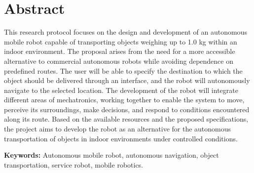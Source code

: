 
\chapter*{Abstract}
\ifProtocolo
\fi

This research protocol focuses on the design and development of an autonomous mobile robot capable of transporting objects weighing up to 1.0 kg within an indoor environment. The proposal arises from the need for a more accessible alternative to commercial autonomous robots while avoiding dependence on predefined routes. The user will be able to specify the destination to which the object should be delivered through an interface, and the robot will autonomously navigate to the selected location. The development of the robot will integrate different areas of mechatronics, working together to enable the system to move, perceive its surroundings, make decisions, and respond to conditions encountered along its route. Based on the available resources and the proposed specifications, the project aims to develop the robot as an alternative for the autonomous transportation of objects in indoor environments under controlled conditions.

\vspace{1.5em}
\noindent\textbf{Keywords:} Autonomous mobile robot, autonomous navigation, object transportation, service robot, mobile robotics.